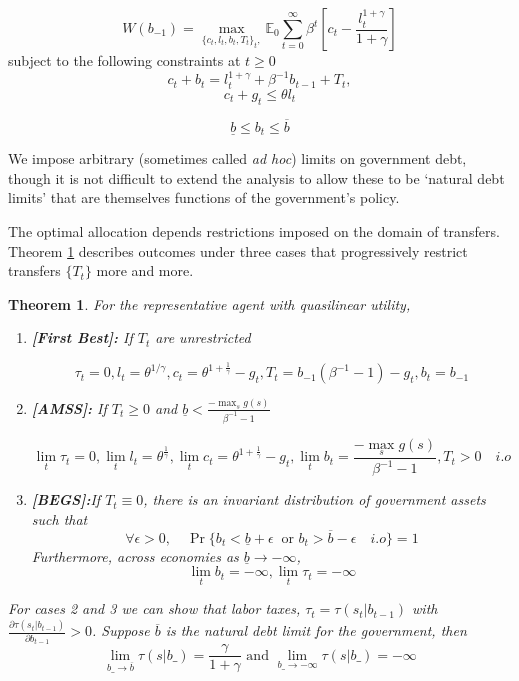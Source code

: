 \documentclass[thmsb,11pt]{article}
\newtheorem{theorem}{Theorem}
\begin{document}
\begin{equation}
W(b_{-1})= \max_{\{c_t,l_t,b_{t},T_t\}_t,}\mathbb{E}_0\sum_{t=0}^\infty \beta^t \left[c_t-\frac{l_t^{1+\gamma}}{1+\gamma}\right]
\end{equation}
subject to the following constraints at  $t\geq 0$
\begin{equation}
\label{eq imp}
c_t+b_{t}=l_t^{1+\gamma}+\beta^{-1}b_{t-1}+T_t ,
\end{equation}
\begin{equation}
c_t+g_t \leq \theta l_t
\end{equation}

\begin{equation}
\label{eq bounds}
\underline{b}\leq b_t\leq \overline{b}
\end{equation}

We impose arbitrary (sometimes called {\em ad hoc}) limits on government debt, though it is not difficult to extend the analysis to allow
these to be `natural debt limits' that are themselves functions  of the government's policy.

The optimal allocation depends  restrictions imposed on the domain of transfers. Theorem \ref{thm rep agent} describes outcomes under three cases that progressively restrict transfers $\{T_t\}$ more and more.


\begin{theorem}
\label{thm rep agent}
For the representative agent with quasilinear utility,

\begin{enumerate}


\item \textbf{[First Best]:} If $T_t$ are unrestricted

\[\tau_t=0,l_t=\theta^{1/\gamma},c_t=\theta^{1+ \frac{1}{\gamma}}-g_t,T_t=b_{-1}(\beta^{-1}-1)-g_t,b_t=b_{-1}\]


\item \textbf{[AMSS]:} If $T_t\geq 0$ and $\underline{b}<\frac{-\max_{s}g(s)}{\beta^{-1}-1}$

\[\lim_t \tau_t=0, \lim_t l_t=\theta^{\frac{1}{\gamma}},\lim_t c_t=\theta^{1+ \frac{1}{\gamma}}-g_t, \lim_t b_t=\frac{-\max_{s}g(s)}{\beta^{-1}-1}, T_t>0 \quad i.o\]
\item \textbf{[BEGS]:}If $T_t\equiv 0$, there is an invariant distribution of government assets such that
\[\forall \epsilon>0, \quad \Pr\{b_t<\underline{b}+\epsilon  \ \text{ or } b_t>\overline{b}-\epsilon \quad i.o \}=1\]
Furthermore,  across economies as $\underline{b}\to -\infty$,
\[\lim_t b_t=-\infty, \lim_t \tau_t=-\infty\]

\end{enumerate}
For cases 2 and 3 we can show that labor taxes, $\tau_t=\tau(s_t|b_{t-1})$ with $\frac{\partial  \tau(s_{t}|b_{t-1})}{\partial b_{t-1}}>0$. Suppose $\overline{b}$ is the natural debt limit for the government, then
\[\lim_{b\_ \to \overline{b}}\tau (s
|b\_)=\frac{\gamma}{1+\gamma} \text{ and } \lim_{b\_ \to -\infty}\tau (s|b\_)=-\infty\]
\end{theorem}
\end{document}
